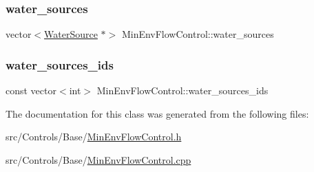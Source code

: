 \subsubsection{\texorpdfstring{water\+\_\+sources}{water\_sources}}
{\footnotesize\ttfamily vector$<$\mbox{\hyperlink{classWaterSource}{Water\+Source}} $\ast$$>$ Min\+Env\+Flow\+Control\+::water\+\_\+sources\hspace{0.3cm}{\ttfamily [protected]}}

\mbox{\label{classMinEnvFlowControl_a775d6408e5c581754ee4240eea68abdc}} 
\subsubsection{\texorpdfstring{water\+\_\+sources\+\_\+ids}{water\_sources\_ids}}
{\footnotesize\ttfamily const vector$<$int$>$ Min\+Env\+Flow\+Control\+::water\+\_\+sources\+\_\+ids}



The documentation for this class was generated from the following files\+:\begin{DoxyCompactItemize}
\item 
src/\+Controls/\+Base/\mbox{\hyperlink{MinEnvFlowControl_8h}{Min\+Env\+Flow\+Control.\+h}}\item 
src/\+Controls/\+Base/\mbox{\hyperlink{MinEnvFlowControl_8cpp}{Min\+Env\+Flow\+Control.\+cpp}}\end{DoxyCompactItemize}
